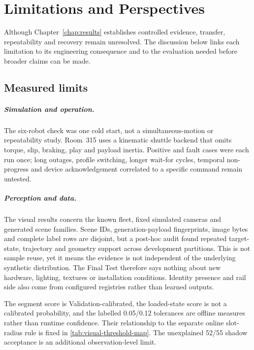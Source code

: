 \chapter{Limitations and Perspectives}
\label{chap:perspectives}

Although Chapter~\ref{chap:results} establishes controlled evidence, transfer,
repeatability and recovery remain unresolved. The discussion below links each
limitation to its engineering consequence and to the evaluation needed before
broader claims can be made.

\section{Measured limits}

\paragraph{Simulation and operation.}
The six-robot check was one cold start, not a simultaneous-motion or
repeatability study. Room~315 uses a kinematic shuttle backend that omits torque,
slip, braking, play and payload inertia. Positive and fault cases were each run
once; long
outages, profile switching, longer wait-for cycles, temporal non-progress and
device acknowledgement correlated to a specific command remain untested.

\paragraph{Perception and data.}
The visual results concern the known fleet, fixed simulated cameras and
generated scene families. Scene IDs, generation-payload fingerprints, image
bytes and complete label rows are disjoint, but a post-hoc audit found repeated
target-state, trajectory and geometry support across development partitions.
This is not sample reuse, yet it means the evidence is not independent of the
underlying synthetic distribution. The Final Test therefore says nothing about
new hardware, lighting, textures or installation conditions. Identity presence
and rail side also come from configured registries rather than learned outputs.

The segment score is Validation-calibrated, the loaded-state score is not a
calibrated probability, and the labelled 0.05/0.12 tolerances are offline
measures rather than runtime confidence. Their relationship to the separate
online slot-radius rule is fixed in \cref{tab:visual-threshold-map}. The
unexplained 52/55 shadow acceptance is an additional observation-level limit.


